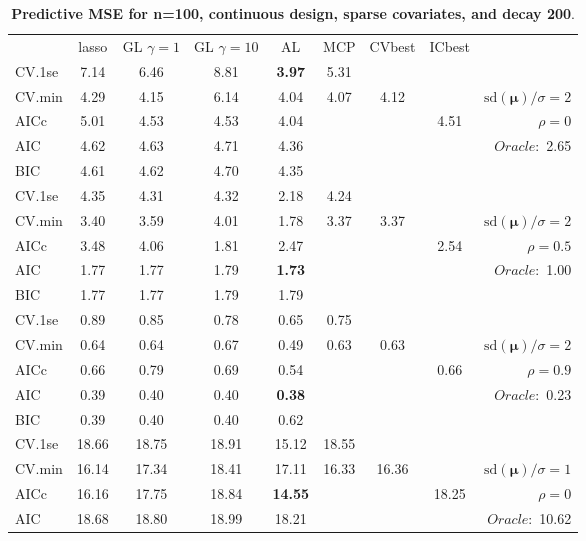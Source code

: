 \clearpage
\begin{table}\vspace{-.5cm}
\caption[l]{ { \bf Predictive MSE for n=100, continuous design, 
sparse covariates, and  decay  200}.}
\vspace{-.5cm}
\footnotesize{}
\begin{center}
\begin{tabular}{l*{7}{c}|r}
 & lasso & GL $\gamma=1$ & GL $\gamma=10$ & AL & MCP  & CVbest & ICbest  \\
\cline{1-9}
CV.1se & 7.14 & 6.46 & 8.81 & {\bf 3.97} & 5.31 & & & \\
CV.min & 4.29 & 4.15 & 6.14 & 4.04 & 4.07 & 4.12 & & $\mathrm{sd}(\mathbf{\mu})/\sigma=2$ \\
AICc & 5.01 & 4.53 & 4.53 & 4.04 & & & 4.51 &  $\rho=0$ \\
AIC & 4.62 & 4.63 & 4.71 & 4.36 & & & &  \multirow{2}{*}{$Oracle: $ 2.65} \\
BIC & 4.61 & 4.62 & 4.70 & 4.35 & & & &  \\
 \hline 
CV.1se & 4.35 & 4.31 & 4.32 & 2.18 & 4.24 & & & \\
CV.min & 3.40 & 3.59 & 4.01 & 1.78 & 3.37 & 3.37 & & $\mathrm{sd}(\mathbf{\mu})/\sigma=2$ \\
AICc & 3.48 & 4.06 & 1.81 & 2.47 & & & 2.54 &  $\rho=0.5$ \\
AIC & 1.77 & 1.77 & 1.79 & {\bf 1.73} & & & &  \multirow{2}{*}{$Oracle: $ 1.00} \\
BIC & 1.77 & 1.77 & 1.79 & 1.79 & & & &  \\
 \hline 
CV.1se & 0.89 & 0.85 & 0.78 & 0.65 & 0.75 & & & \\
CV.min & 0.64 & 0.64 & 0.67 & 0.49 & 0.63 & 0.63 & & $\mathrm{sd}(\mathbf{\mu})/\sigma=2$ \\
AICc & 0.66 & 0.79 & 0.69 & 0.54 & & & 0.66 &  $\rho=0.9$ \\
AIC & 0.39 & 0.40 & 0.40 & {\bf 0.38} & & & &  \multirow{2}{*}{$Oracle: $ 0.23} \\
BIC & 0.39 & 0.40 & 0.40 & 0.62 & & & &  \\
 \hline 
CV.1se & 18.66 & 18.75 & 18.91 & 15.12 & 18.55 & & & \\
CV.min & 16.14 & 17.34 & 18.41 & 17.11 & 16.33 & 16.36 & & $\mathrm{sd}(\mathbf{\mu})/\sigma=1$ \\
AICc & 16.16 & 17.75 & 18.84 & {\bf 14.55} & & & 18.25 &  $\rho=0$ \\
AIC & 18.68 & 18.80 & 18.99 & 18.21 & & & &  \multirow{2}{*}{$Oracle: $ 10.62} \\

\end{tabular}
\end{center}
\end{table}
